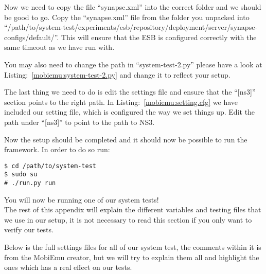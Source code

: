     Now we need to copy the file “synapse.xml” into the correct folder and we should be good to go. Copy the “synapse.xml” file from the folder you unpacked into “/path/to/system-test/experiments/esb/repository/deployment/server/synapse-configs/default/”. This will ensure that the ESB is configured correctly with the same timeout as we have run with.

    You may also need to change the path in “system-test-2.py” please have a look at Listing:~\ref{mobiemu:system-test-2.py} and change it to reflect your setup.

    The last thing we need to do is edit the settings file and ensure that the “[ns3]” section points to the right path. In Listing:~\ref{mobiemu:setting.cfg} we have included our setting file, which is configured the way we set things up. Edit the path under “[ns3]” to point to the path to NS3.

Now the setup should be completed and it should now be possible to run the framework. In order to do so run:
\lstset{language=bash, style=shell}
\begin{lstlisting}[frame=single, caption={Run MobiEmu}, label=mobiemu:run, breaklines=true]
$ cd /path/to/system-test
$ sudo su
# ./run.py run
\end{lstlisting}

    You will now be running one of our system tests!\\

    The rest of this appendix will explain the different variables and testing files that we use in our setup, it is not necessary to read this section if you only want to verify our tests.

    Below is the full settings files for all of our system test, the comments within it is from the MobiEmu creator, but we will try to explain them all and highlight the ones which has a real effect on our tests.

